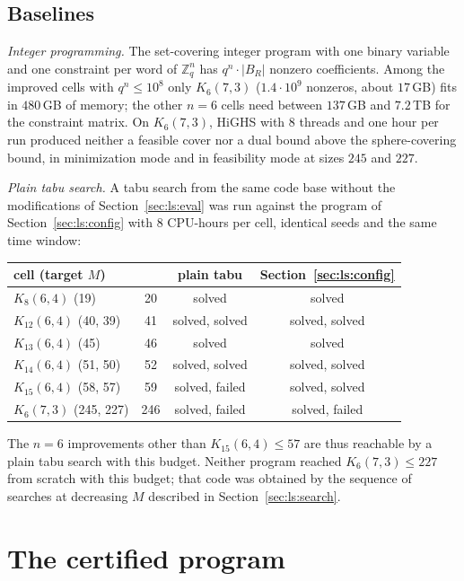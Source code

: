 \documentclass[11pt]{amsart}
\newcommand{\Kq}[3]{K_{#1}(#2,#3)}
\newcommand{\Zq}{\mathbb{Z}_q}
\begin{document}
\subsection{Baselines}\label{app:impl:baseline}

\emph{Integer programming.} The set-covering integer program with one
binary variable and one constraint per word of $\Zq^n$ has $q^n\cdot|B_R|$
nonzero coefficients. Among the improved cells with $q^n\le 10^8$ only
$\Kq{6}{7}{3}$ ($1.4\cdot 10^9$ nonzeros, about $17$\,GB) fits in
$480$\,GB of memory; the other $n=6$ cells need between $137$\,GB and
$7.2$\,TB for the constraint matrix. On $\Kq{6}{7}{3}$, HiGHS with $8$
threads and one hour per run produced neither a feasible cover nor a dual
bound above the sphere-covering bound, in minimization mode and in
feasibility mode at sizes $245$ and $227$.

\emph{Plain tabu search.} A tabu search from the same code base without
the modifications of Section~\ref{sec:ls:eval} was run against the program
of Section~\ref{sec:ls:config} with $8$ CPU-hours per cell, identical
seeds and the same time window:

\begin{center}
\begin{tabular}{lccc}
\toprule
cell (target $M$) & \cite{Keri} & plain tabu & Section~\ref{sec:ls:config} \\
\midrule
$\Kq{8}{6}{4}$ (19) & 20 & solved & solved \\
$\Kq{12}{6}{4}$ (40, 39) & 41 & solved, solved & solved, solved \\
$\Kq{13}{6}{4}$ (45) & 46 & solved & solved \\
$\Kq{14}{6}{4}$ (51, 50) & 52 & solved, solved & solved, solved \\
$\Kq{15}{6}{4}$ (58, 57) & 59 & solved, failed & solved, solved \\
$\Kq{6}{7}{3}$ (245, 227) & 246 & solved, failed & solved, failed \\
\bottomrule
\end{tabular}
\end{center}

The $n=6$ improvements other than $\Kq{15}{6}{4}\le 57$ are thus
reachable by a plain tabu search with this budget. Neither program reached
$\Kq{6}{7}{3}\le 227$ from scratch with this budget; that code was
obtained by the sequence of searches at decreasing $M$ described in
Section~\ref{sec:ls:search}.

\section{The certified program}\label{app:sdp}
\end{document}
